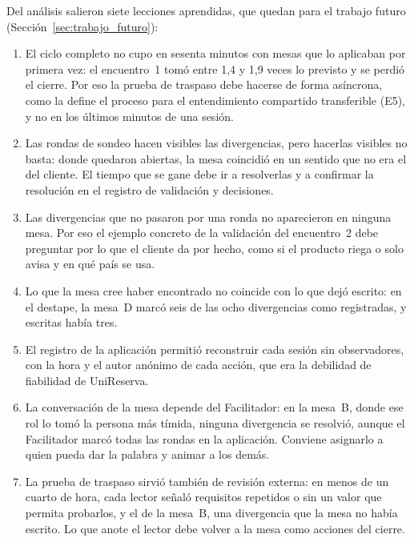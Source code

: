 \documentclass[12pt,letterpaper,oneside]{report}
\begin{document}
Del análisis salieron siete lecciones aprendidas, que quedan para el trabajo
futuro (Sección~\ref{sec:trabajo_futuro}):
\begin{enumerate}
  \item El ciclo completo no cupo en sesenta minutos con mesas que lo aplicaban
        por primera vez: el encuentro~1 tomó entre 1,4 y 1,9 veces lo previsto y
        se perdió el cierre. Por eso la prueba de traspaso debe hacerse de forma
        asíncrona, como la define el proceso para el entendimiento compartido
        transferible (E5), y no en los últimos minutos de una sesión.
  \item Las rondas de sondeo hacen visibles las divergencias, pero hacerlas
        visibles no basta: donde quedaron abiertas, la mesa coincidió en un
        sentido que no era el del cliente. El tiempo que se gane debe ir a
        resolverlas y a confirmar la resolución en el registro de validación y
        decisiones.
  \item Las divergencias que no pasaron por una ronda no aparecieron en ninguna
        mesa. Por eso el ejemplo concreto de la validación del encuentro~2 debe
        preguntar por lo que el cliente da por hecho, como si el producto riega
        o solo avisa y en qué país se usa.
  \item Lo que la mesa cree haber encontrado no coincide con lo que dejó
        escrito: en el destape, la mesa~D marcó seis de las ocho divergencias
        como registradas, y escritas había tres.
  \item El registro de la aplicación permitió reconstruir cada sesión sin
        observadores, con la hora y el autor anónimo de cada acción, que era la
        debilidad de fiabilidad de UniReserva.
  \item La conversación de la mesa depende del Facilitador: en la mesa~B, donde
        ese rol lo tomó la persona más tímida, ninguna divergencia se resolvió,
        aunque el Facilitador marcó todas las rondas en la aplicación. Conviene
        asignarlo a quien pueda dar la palabra y animar a los demás.
  \item La prueba de traspaso sirvió también de revisión externa: en menos de un
        cuarto de hora, cada lector señaló requisitos repetidos o sin un valor
        que permita probarlos, y el de la mesa~B, una divergencia que la mesa no
        había escrito. Lo que anote el lector debe volver a la mesa como
        acciones del cierre.
\end{enumerate}
\end{document}
